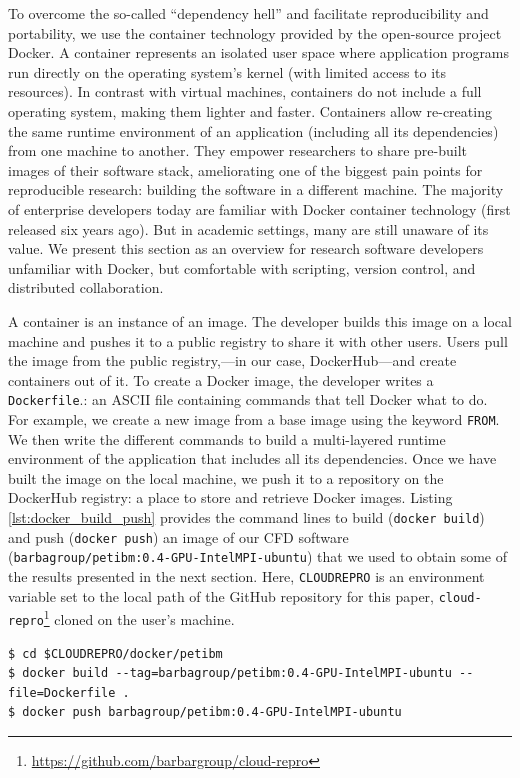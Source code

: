 \documentclass[10pt,journal,compsoc]{IEEEtran}
\begin{document}
To overcome the so-called ``dependency hell'' and facilitate reproducibility and portability, we use the container technology provided by the open-source project Docker.
A container represents an isolated user space where application programs run directly on the operating system's kernel (with limited access to its resources).
In contrast with virtual machines, containers do not include a full operating system, making them lighter and faster.
Containers allow re-creating the same runtime environment of an application (including all its dependencies) from one machine to another. 
They empower researchers to share pre-built images of their software stack, ameliorating one of the biggest pain points for reproducible research: building the software in a different machine. 
The majority of enterprise developers today are familiar with Docker container technology (first released six years ago). 
But in academic settings, many are still unaware of its value. 
We present this section as an overview for research software developers unfamiliar with Docker, but comfortable with scripting, version control, and distributed collaboration.

A container is an instance of an image.
The developer builds this image on a local machine and pushes it to a public registry to share it with other users.
Users pull the image from the public registry,---in our case, DockerHub---and create containers out of it.
To create a Docker image, the developer writes a \texttt{Dockerfile}.: an ASCII file containing commands that tell Docker what to do.
For example, we create a new image from a base image using the keyword \texttt{FROM}.
We then write the different commands to build a multi-layered runtime environment of the application that includes all its dependencies.
Once we have built the image on the local machine, we push it to a repository on the DockerHub registry: a place to store and retrieve Docker images.
Listing \ref{lst:docker_build_push} provides the command lines to build (\texttt{docker build}) and push (\texttt{docker push}) an image of our CFD software (\texttt{barbagroup/petibm:0.4-GPU-IntelMPI-ubuntu}) that we used to obtain some of the results presented in the next section.
Here, \texttt{CLOUDREPRO} is an environment variable set to the local path of the GitHub repository for this paper, \texttt{cloud-repro}\footnote{\url{https://github.com/barbargroup/cloud-repro}} cloned on the user's machine.

\begin{lstlisting}[label=lst:docker_build_push,caption={Build and push a Docker image.}]
$ cd $CLOUDREPRO/docker/petibm
$ docker build --tag=barbagroup/petibm:0.4-GPU-IntelMPI-ubuntu --file=Dockerfile .
$ docker push barbagroup/petibm:0.4-GPU-IntelMPI-ubuntu
\end{lstlisting}
\end{document}
